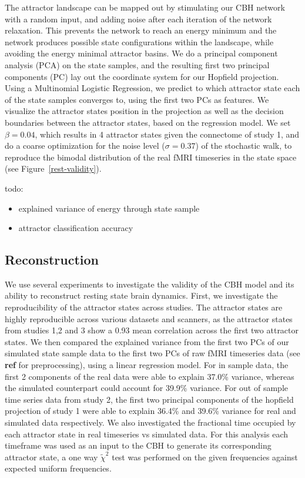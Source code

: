 \documentclass{article}
\begin{document}
The attractor landscape can be mapped out by stimulating our CBH network with a random input, and adding noise after
each iteration of the network relaxation. This prevents the network to reach an energy minimum and the network
produces possible state configurations within the landscape, while avoiding the energy minimal attractor basins.
We do a principal component analysis (PCA) on the state samples, and the resulting first two principal components (PC)
lay out the coordinate system for our Hopfield projection. Using a Multinomial Logistic Regression, we predict to which
attractor state each of the state samples converges to, using the first two PCs as features. We visualize the attractor
states position in the projection as well as the decision boundaries between the attractor states, based on the
regression model. We set $\beta = 0.04$, which results in 4 attractor states given the connectome of study 1, and do a
coarse optimization for the noise level ($\sigma=0.37$) of the stochastic walk, to reproduce the bimodal distribution
of the real fMRI timeseries in the state space (see Figure~\ref{rest-validity}).

todo:

\begin{itemize}
\item explained variance of energy through state sample
\item attractor classification accuracy
\end{itemize}

\subsection{Reconstruction}\label{Reconstruction}

We use several experiments to investigate the validity of the CBH model and its ability to reconstruct resting state
brain dynamics. First, we investigate the reproducibility  of the attractor states across studies.
The attractor states are highly reproducible across various datasets and scanners, as the attractor states from studies
1,2 and 3 show a 0.93 mean correlation across the first two attractor states.
We then compared the explained variance from the first two PCs of our simulated state sample data to the first two PCs of
raw fMRI timeseries data (see \textbf{ref} for preprocessing), using a linear regression model.
For in sample data, the first 2 components of the real data
were able to explain 37.0\% variance, whereas the simulated counterpart could account for 39.9\% variance. For out of
sample time series data from study 2, the first two principal components of the hopfield projection of study 1 were
able to explain 36.4\% and 39.6\% variance for real and simulated data respectively.
We also investigated the fractional time occupied by each attractor state in real timeseries vs simulated data. For
this analysis each timeframe was used as an input to the CBH to generate its corresponding attractor state, a one
way $\tilde{\chi}^2$ test was performed on the given frequencies against expected uniform frequencies.
\end{document}
